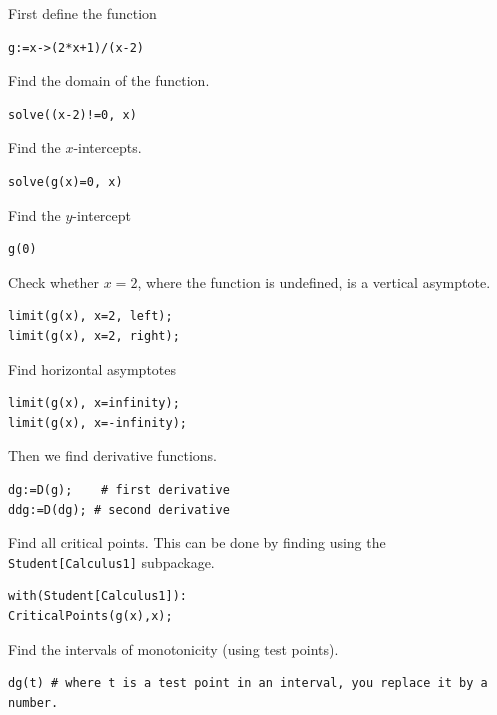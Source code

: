 \documentclass[
  en,11pt,simple]{elegantbook}
\begin{document}
\begin{solution}
{}
First define the function

\begin{verbatim}
g:=x->(2*x+1)/(x-2)
\end{verbatim}

Find the domain of the function.

\begin{verbatim}
solve((x-2)!=0, x)
\end{verbatim}

Find the \(x\)-intercepts.

\begin{verbatim}
solve(g(x)=0, x)
\end{verbatim}

Find the \(y\)-intercept

\begin{verbatim}
g(0)
\end{verbatim}

Check whether \(x=2\), where the function is undefined, is a vertical asymptote.

\begin{verbatim}
limit(g(x), x=2, left);
limit(g(x), x=2, right);
\end{verbatim}

Find horizontal asymptotes

\begin{verbatim}
limit(g(x), x=infinity);
limit(g(x), x=-infinity);
\end{verbatim}

Then we find derivative functions.

\begin{verbatim}
dg:=D(g);    # first derivative
ddg:=D(dg); # second derivative
\end{verbatim}

Find all critical points. This can be done by finding using the \texttt{Student{[}Calculus1{]}} subpackage.

\begin{verbatim}
with(Student[Calculus1]):
CriticalPoints(g(x),x);
\end{verbatim}

Find the intervals of monotonicity (using test points).

\begin{verbatim}
dg(t) # where t is a test point in an interval, you replace it by a number.
\end{verbatim}


\end{solution}
\end{document}

